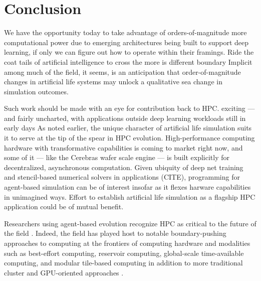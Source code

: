 \section{Conclusion} \label{sec:conclusion}

We have the opportunity today to take advantage of orders-of-magnitude more computational power due to emerging architectures being built to support deep learning, if only we can figure out how to operate within their framings.
Ride the coat tails of artificial intelligence to cross the more is different boundary \citep{anderson1972more}
Implicit among much of the field, it seems, is an anticipation that order-of-magnitude changes in artificial life systems may unlock a qualitative sea change in simulation outcomes.

Such work should be made with an eye for contribution back to HPC.
exciting --- and fairly uncharted, with applications outside deep learning workloads still in early days
As noted earlier, the unique character of artificial life simulation suits it to serve at the tip of the spear in HPC evolution.
High-performance computing hardware with transformative capabilities is coming to market right now, and some of it --- like the Cerebras wafer scale engine \citep{lauterbach2021path} --- is built explicitly for decentralized, asynchronous computation.
Given ubiquity of deep net training and stencil-based numerical solvers in applications (CITE), programming for agent-based simulation can be of interest insofar as it flexes harware capabilities in unimagined ways.
Effort to establish artificial life simulation as a flagship HPC application could be of mutual benefit.

Researchers using agent-based evolution recognize HPC as critical to the future of the field \citep{ackley2016indefinite}.
Indeed, the field has played host to notable boundary-pushing approaches to computing at the frontiers of computing hardware and modalities such as best-effort computing, reservoir computing, global-scale time-available computing, and modular tile-based computing in addition to more traditional cluster and GPU-oriented approaches \citep{moreno2021conduit,ackley2020best,ackley2023robust,heinemann2008artificial,miikkulainen2024evolving}.

